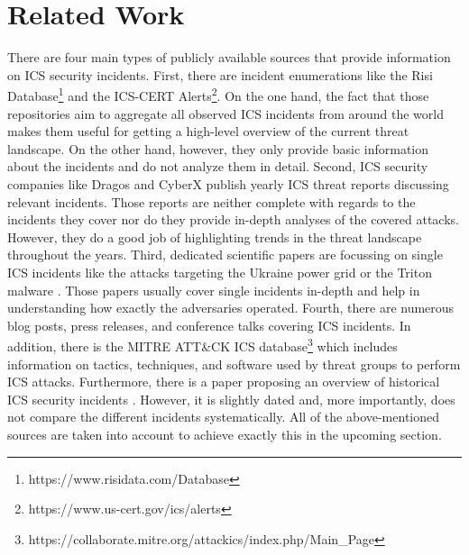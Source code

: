 \documentclass[runningheads]{llncs}
\begin{document}
\section{Related Work}
There are four main types of publicly available sources that provide information on ICS security incidents.
First, there are incident enumerations like the Risi Database\footnote{https://www.risidata.com/Database} and the ICS-CERT Alerts\footnote{https://www.us-cert.gov/ics/alerts}.
On the one hand, the fact that those repositories aim to aggregate all observed ICS incidents from around the world makes them useful for getting a high-level overview of the current threat landscape.
On the other hand, however, they only provide basic information about the incidents and do not analyze them in detail.
Second, ICS security companies like Dragos \cite{dragos.19} and CyberX \cite{cyberx.19} publish yearly ICS threat reports discussing relevant incidents.
Those reports are neither complete with regards to the incidents they cover nor do they provide in-depth analyses of the covered attacks.
However, they do a good job of highlighting trends in the threat landscape throughout the years.
Third, dedicated scientific papers are focussing on single ICS incidents like the attacks targeting the Ukraine power grid \cite{eisac.16} or the Triton malware \cite{pinto.18}. Those papers usually cover single incidents in-depth and help in understanding how exactly the adversaries operated.
Fourth, there are numerous blog posts, press releases, and conference talks covering ICS incidents.
In addition, there is the MITRE ATT\&CK ICS database\footnote{https://collaborate.mitre.org/attackics/index.php/Main\_Page} which includes information on tactics, techniques, and software used by threat groups to perform ICS attacks.
Furthermore, there is a paper proposing an overview of historical ICS security incidents \cite{hemsley.18}.
However, it is slightly dated and, more importantly, does not compare the different incidents systematically.
All of the above-mentioned sources are taken into account to achieve exactly this in the upcoming section.
\end{document}
